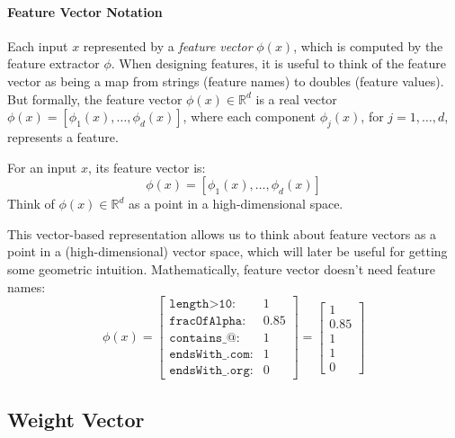 \paragraph{Feature Vector Notation}

Each input $x$ represented by a \textit{feature vector} $\phi(x)$, which is computed by the feature extractor $\phi$.
When designing features, it is useful to think of the feature vector as being a map from strings (feature names) to doubles (feature values).
But formally, the feature vector $\phi(x) \in \mathbb{R}^d$ is a real vector $\phi(x) = [\phi_1(x), \dots, \phi_d(x)]$, where each component $\phi_j(x)$, for $j = 1, \dots, d$, represents a feature.

\begin{example}%
 For an input $x$, its feature vector is:
\[
    \phi(x) = [\phi_1(x), \dots, \phi_d(x)]
\]
Think of $\phi(x) \in \mathbb{R}^d$ as a point in a high-dimensional space.
\end{example}

This vector-based representation allows us to think about feature vectors as a point in a (high-dimensional) vector space, which will later be useful for getting some geometric intuition.
% 
Mathematically, feature vector doesn't need feature names:
\[
\phi(x) = \begin{bmatrix} %
\texttt{length>10}: & 1\\
\texttt{fracOfAlpha}: & 0.85\\
\texttt{contains\_@}: & 1\\
\texttt{endsWith\_.com}: & 1\\
\texttt{endsWith\_.org}: & 0
\end{bmatrix} = \begin{bmatrix}
1\\
0.85\\
1\\
1\\
0
\end{bmatrix}
\]



\subsection{Weight Vector} %
\label{sub:weight_vector}


